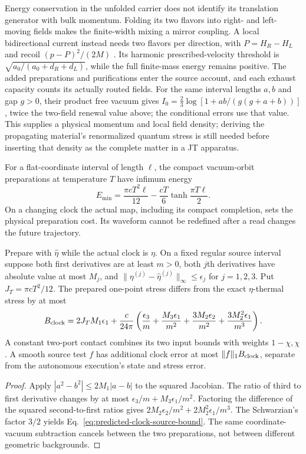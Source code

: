Energy conservation in the unfolded carrier does not identify its
translation generator with bulk momentum. Folding its two flavors into
right- and left-moving fields makes the finite-width mixing a mirror
coupling. A local bidirectional current instead needs two flavors per
direction, with $P=H_R-H_L$ and recoil $(p-P)^2/(2M)$
\cite[Proposition on bidirectional current and physical recoil]{QRC}.
Its harmonic prescribed-velocity threshold is
$\sqrt{a_0/(a_0+d_R+d_L)}$, while the full finite-mass energy remains
positive. The added preparations and purifications enter the source
account, and each exhaust capacity counts its actually routed fields.
For the same interval lengths $a,b$ and gap $g>0$, their product free
vacuum gives $I_0=\frac23\log[1+ab/(g(g+a+b))]$, twice the
two-field renewal value above; the conditional errors use that value.
This supplies a physical momentum and local field density; deriving
the propagating material's renormalized quantum stress is still needed
before inserting that density as the complete matter in a JT apparatus.

For a flat-coordinate interval of length $\ell$, the compact
vacuum-orbit preparations at temperature $T$ have infimum energy
\[
 E_{\min}=\frac{\pi cT^2\ell}{12}
       -\frac{cT}{6}\tanh\frac{\pi T\ell}{2}.
\]
On a changing clock the actual map, including its compact completion,
sets the physical preparation cost. Its waveform cannot be redefined
after a read changes the future trajectory.

\begin{proposition}
\label{prop:predicted-thermal-clock}
Prepare with $\widehat\eta$ while the actual clock is $\eta$.
On a fixed regular source interval suppose both first derivatives
are at least $m>0$, both $j$th derivatives have absolute value at
most $M_j$, and
$\|\eta^{(j)}-\widehat\eta^{(j)}\|_\infty\le\epsilon_j$ for
$j=1,2,3$. Put $J_T=\pi cT^2/12$. The prepared one-point stress
differs from the exact $\eta$-thermal stress by at most
\begin{equation}\label{eq:predicted-clock-source-bound}
 B_{\rm clock}=2J_TM_1\epsilon_1+\frac{c}{24\pi}
 \left(\frac{\epsilon_3}{m}+\frac{M_3\epsilon_1}{m^2}
       +\frac{3M_2\epsilon_2}{m^2}
       +\frac{3M_2^2\epsilon_1}{m^3}\right).
\end{equation}
A constant two-port contact combines its two input bounds with
weights $1-\chi,\chi$. A smooth source test $f$ has additional
clock error at most $\|f\|_1 B_{\rm clock}$, separate from the
autonomous execution's state and stress error.
\end{proposition}
\begin{proof}
Apply $|a^2-b^2|\le2M_1|a-b|$ to the squared Jacobian.
The ratio of third to first derivative changes by at most
$\epsilon_3/m+M_3\epsilon_1/m^2$.
Factoring the difference of the squared second-to-first ratios gives
$2M_2\epsilon_2/m^2+2M_2^2\epsilon_1/m^3$.
The Schwarzian's factor $3/2$ yields
Eq.~\eqref{eq:predicted-clock-source-bound}.
The same coordinate-vacuum subtraction cancels between the two
preparations, not between different geometric backgrounds.
\end{proof}

